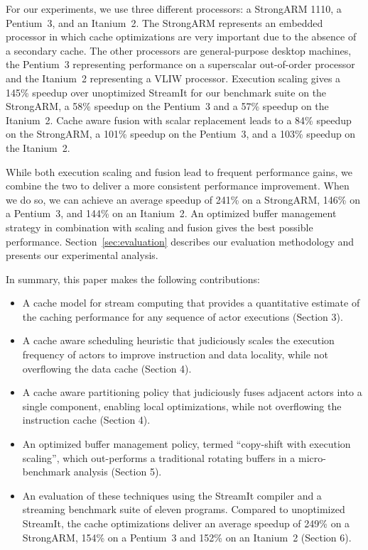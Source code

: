 For our experiments, we use three different processors: a StrongARM
1110, a Pentium~3, and an Itanium~2.  The StrongARM represents an
embedded processor in which cache optimizations are very important due
to the absence of a secondary cache.  The other processors are
general-purpose desktop machines, the Pentium~3 representing
performance on a superscalar out-of-order processor and the Itanium~2
representing a VLIW processor.  Execution scaling gives a 145\%
speedup over unoptimized StreamIt for our benchmark suite on the
StrongARM, a 58\% speedup on the Pentium~3 and a 57\% speedup on the
Itanium~2. Cache aware fusion with scalar replacement leads to a 84\%
speedup on the StrongARM, a 101\% speedup on the Pentium~3, and a
103\% speedup on the Itanium~2.

While both execution scaling and fusion lead to frequent performance
gains, we combine the two to deliver a more consistent performance
improvement. When we do so, we can achieve an average speedup of 241\%
on a StrongARM, 146\% on a Pentium~3, and 144\% on 
an Itanium~2. An optimized buffer management strategy in
combination with scaling and fusion gives the best possible performance.
Section~\ref{sec:evaluation} describes our evaluation
methodology and presents our experimental analysis.

In summary, this paper makes the following contributions:
\begin{itemize}
\item A cache model for stream computing that provides a quantitative
estimate of the caching performance for any sequence of actor
executions (Section 3).
\item A cache aware scheduling heuristic that judiciously scales the
execution frequency of actors to improve instruction and data locality,
while not overflowing the data cache (Section 4).
\item A cache aware partitioning policy that judiciously fuses
adjacent actors into a single component, enabling local optimizations,
while not overflowing the instruction cache (Section 4).
\item An optimized buffer management policy, termed ``copy-shift with
execution scaling'', which out-performs a traditional rotating buffers
in a micro-benchmark analysis (Section 5).
\item An evaluation of these techniques using the
StreamIt compiler and a streaming benchmark suite of eleven programs.
Compared to unoptimized StreamIt, the cache optimizations deliver an
average speedup of 249\% on a StrongARM, 154\% on a Pentium~3 and
152\% on an Itanium~2 (Section 6).
\end{itemize}

